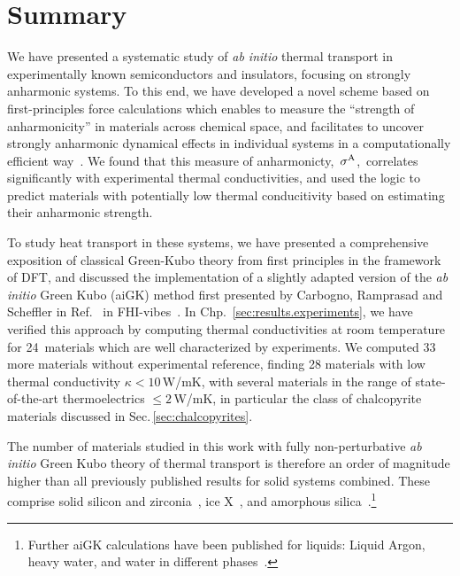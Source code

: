 \section{Summary}

We have presented a systematic study of \emph{ab initio} thermal transport in experimentally known semiconductors and insulators, focusing on strongly anharmonic systems. To this end, we have developed a novel scheme based on first-principles force calculations which enables to measure the ``strength of anharmonicity'' in materials across chemical space, and facilitates to uncover strongly anharmonic dynamical effects in individual systems in a computationally efficient way~\cite{Knoop2020}.
 We found that this measure of anharmonicty,~$\sigma^\mathrm{A}$,~correlates significantly with experimental thermal conductivities, and used the logic to predict materials with potentially low thermal conducitivity based on estimating their anharmonic strength.

To study heat transport in these systems, we have presented a comprehensive exposition of classical Green-Kubo theory from first principles in the framework of DFT, and discussed the implementation of a slightly adapted version of the \emph{ab initio} Green Kubo (aiGK) method first presented by Carbogno, Ramprasad and Scheffler in Ref.~\cite{Carbogno2016} in FHI-vibes~\cite{FHI-vibes}. In Chp.~\ref{sec:results.experiments}, we have verified this approach by computing thermal conductivities at room temperature for 24~materials which are well characterized by experiments. 
We computed 33 more materials without experimental reference, finding 28 materials with low thermal conductivity $\kappa < 10$\,W/mK, with several materials in the range of state-of-the-art thermoelectrics $\leq 2$\,W/mK, in particular the class of chalcopyrite materials discussed in Sec.\,\ref{sec:chalcopyrites}.

The number of materials studied in this work with fully non-perturbative \emph{ab initio} Green Kubo theory of thermal transport is therefore an order of magnitude higher than all previously published results for solid systems combined. These comprise solid silicon and zirconia~\cite{Carbogno2016}, ice X~\cite{Grasselli2020}, and amorphous silica~\cite{Marcolongo2020}.\footnote{Further aiGK calculations have been published for liquids: Liquid Argon, heavy water, and water in different phases~\cite{Marcolongo2016,Marcolongo2020,Grasselli2020}.}

